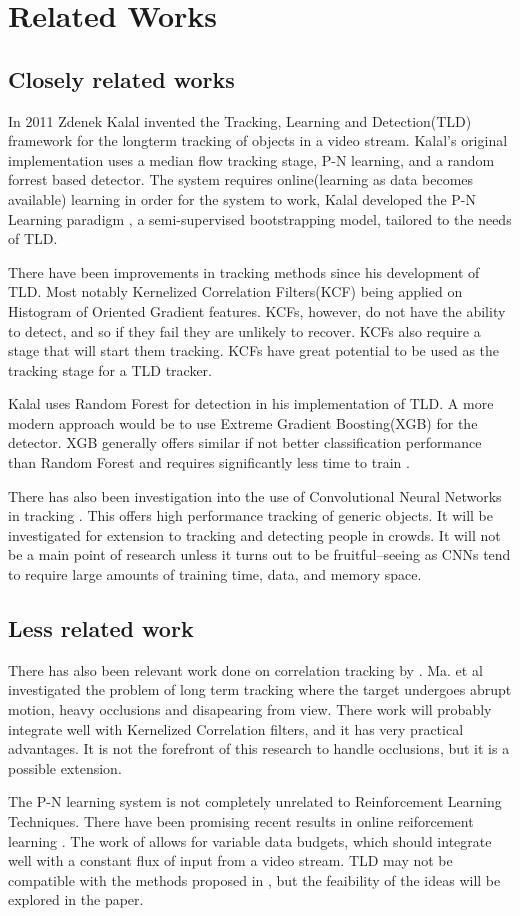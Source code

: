 \section{Related Works}
\subsection{Closely related works}
In 2011 Zdenek Kalal invented the Tracking, Learning and Detection(TLD) framework for the longterm tracking of objects in a video stream\cite{Kalal2011}.
Kalal's original implementation uses a median flow tracking stage, P-N learning, and a random forrest based detector.
The system requires online(learning as data becomes available) learning in order for the system to work, Kalal developed the P-N Learning paradigm \cite{PNLearning}, a semi-supervised bootstrapping model, tailored to the needs of TLD.

There have been improvements in tracking methods since his development of TLD.
Most notably Kernelized Correlation Filters(KCF) being applied on Histogram of Oriented Gradient features\cite{Enriques2014}.
KCFs, however, do not have the ability to detect, and so if they fail they are unlikely to recover.
KCFs also require a stage that will start them tracking.
KCFs have great potential to be used as the tracking stage for a TLD tracker.

Kalal uses Random Forest for detection in his implementation of TLD.
A more modern approach would be to use Extreme Gradient Boosting(XGB) for the detector.
XGB generally offers similar if not better classification performance than Random Forest and requires significantly less time to train \cite{comparativeXGB}.


There has also been investigation into the use of Convolutional Neural Networks in tracking \cite{CNNTracking}.
This offers high performance tracking of generic objects.
It will be investigated for extension to tracking and detecting people in crowds.
It will not be a main point of research unless it turns out to be fruitful--seeing as CNNs tend to require large amounts of training time, data, and memory space.

\subsection{Less related work}
There has also been relevant work done on correlation tracking by \cite{Ma2015Correlation}.
Ma. et al investigated the problem of long term tracking where the target undergoes abrupt motion, heavy occlusions and disapearing from view.
There work will probably integrate well with Kernelized Correlation filters, and it has very practical advantages.
It is not the forefront of this research to handle occlusions, but it is a possible extension.

The P-N learning system is not completely unrelated to Reinforcement Learning Techniques.
There have been promising recent results in online reiforcement learning \cite{onlineRL}.
The work of \cite{onlineRL} allows for variable data budgets, which should integrate well with a constant flux of input from a video stream.
TLD may not be compatible with the methods proposed in \cite{onlineRL}, but the feaibility of the ideas will be explored in the paper.
